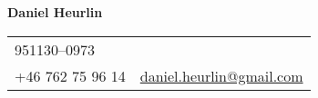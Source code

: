 \documentclass[letterpaper,11pt,oneside]{article}
\begin{document}

\noindent  \LARGE{\textbf{Daniel Heurlin}}  \\
\vspace{-2ex}
\toprule
\normalsize


\begin{center}
\begin{tabular}{l l}
 951130–0973      & \hspace{1in}  \\
 +46 762 75 96 14 & \hspace{1in}  
 \href{mailto:daniel.heurlin@gmail.com}{daniel.heurlin@gmail.com}
\end{tabular}
\end{center}

\vspace{1em}

\end{document}
